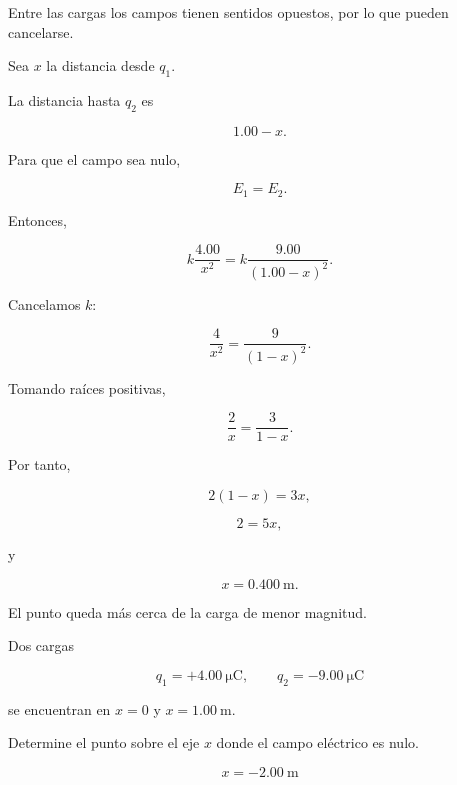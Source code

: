 \begin{explicacion}

Entre las cargas los campos tienen sentidos opuestos, por lo que pueden cancelarse.

Sea \(x\) la distancia desde \(q_1\).

La distancia hasta \(q_2\) es

\[
1.00-x.
\]

Para que el campo sea nulo,

\[
E_1=E_2.
\]

Entonces,

\[
k\frac{4.00}{x^2}
=
k\frac{9.00}{(1.00-x)^2}.
\]

Cancelamos \(k\):

\[
\frac{4}{x^2}=\frac{9}{(1-x)^2}.
\]

Tomando raíces positivas,

\[
\frac{2}{x}=\frac{3}{1-x}.
\]

Por tanto,

\[
2(1-x)=3x,
\]

\[
2=5x,
\]

y

\[
\boxed{x=\SI{0.400}{\metre}}.
\]

El punto queda más cerca de la carga de menor magnitud.

\end{explicacion}


\begin{ejercicio}

Dos cargas

\[
q_1=+\SI{4.00}{\micro\coulomb},
\qquad
q_2=-\SI{9.00}{\micro\coulomb}
\]

se encuentran en \(x=0\) y \(x=\SI{1.00}{\metre}\).

Determine el punto sobre el eje \(x\) donde el campo eléctrico es nulo.

\end{ejercicio}

\begin{respuesta}

\[
\boxed{x=-\SI{2.00}{\metre}}
\]

\end{respuesta}

